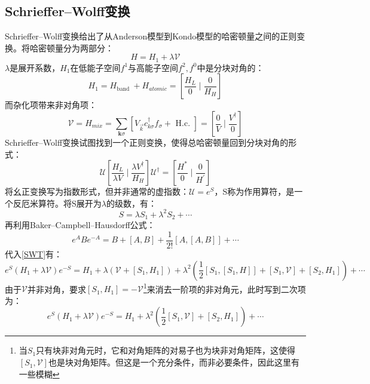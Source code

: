 \documentclass[10pt,openany]{book}
\theoremstyle{thmstyle} %
\theoremstyle{defstyle} %
\theoremstyle{prostyle} %
\begin{document}
\subsection*{Schrieffer–Wolff变换}
Schrieffer–Wolff变换给出了从Anderson模型到Kondo模型的哈密顿量之间的正则变换。将哈密顿量分为两部分：
\begin{equation}
  H=H_1+\lambda \mathcal{V}
\end{equation}
$ \lambda $是展开系数，$ H_1 $在低能子空间$ f^1 $与高能子空间$ f^2,f^0 $中是分块对角的：
\begin{equation}
  H_1=H_{\text {band }}+H_{a t o m i c}=\left[\frac{H_L}{0} \mid \frac{0}{H_H}\right]
\end{equation}   
而杂化项带来非对角项：
\begin{equation}
  \mathcal{V}=H_{m i x}=\sum_{\mathbf{k} \sigma}\left[V_{\vec{k}} c_{k \sigma}^{\dagger} f_\sigma+\text { H.c. }\right]=\left[\frac{0}{V} \mid \frac{V^{\dagger}}{0}\right]
\end{equation}
Schrieffer–Wolff变换试图找到一个正则变换，使得总哈密顿量回到分块对角的形式：
\begin{equation}
  \mathcal{U}\left[\frac{H_L}{\lambda V} \mid \frac{\lambda V^{\dagger}}{H_H}\right] \mathcal{U}^{\dagger}=\left[\frac{H^*}{0} \mid \frac{0}{H^{\prime}}\right]
  \label{SWT}
\end{equation}
将幺正变换写为指数形式，但并非通常的虚指数：$ \mathcal{U}=e^S $，S称为作用算符，是一个反厄米算符。将S展开为$ \lambda $的级数，有：
\begin{equation}
  S=\lambda S_1+\lambda^2 S_2+\cdots
\end{equation}  
再利用Baker–Campbell–Hausdorff公式：
\begin{equation}
  e^A B e^{-A}=B+[A, B]+\frac{1}{2 !}[A,[A, B]]+\cdots
\end{equation}
代入\eqref{SWT}有：
\begin{equation}
  e^S\left(H_1+\lambda \mathcal{V}\right) e^{-S}=H_1+\lambda\left(\mathcal{V}+\left[S_1, H_1\right]\right)+\lambda^2\left(\frac{1}{2}\left[S_1,\left[S_1, H\right]\right]+\left[S_1, \mathcal{V}\right]+\left[S_2, H_1\right]\right)+\cdots
\end{equation}
由于$ \mathcal{V} $并非对角，要求$ \left[S_1, H_1\right]=-\mathcal{V} $\footnote{当$ S_1 $只有块非对角元时，它和对角矩阵的对易子也为块非对角矩阵，这使得$ \left[S_1, \mathcal{V}\right] $也是块对角矩阵。但这是一个充分条件，而非必要条件，因此这里有一些模糊  }来消去一阶项的非对角元，此时写到二次项为：
\begin{equation}
  e^S\left(H_1+\lambda \mathcal{V}\right) e^{-S}=H_1+\lambda^2\left(\frac{1}{2}\left[S_1, \mathcal{V}\right]+\left[S_2, H_1\right]\right)+\cdots
\end{equation}
\end{document}
